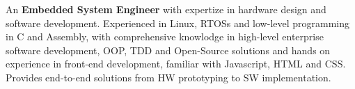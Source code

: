 An \textbf{Embedded System Engineer} with expertize in hardware design and software development. Experienced in Linux,
RTOSs and low-level programming in C and Assembly, with comprehensive knowlodge in high-level
enterprise software development, OOP, TDD and Open-Source solutions and hands on experience in front-end development,
familiar with Javascript, HTML and CSS. Provides end-to-end solutions from HW prototyping to SW implementation.
